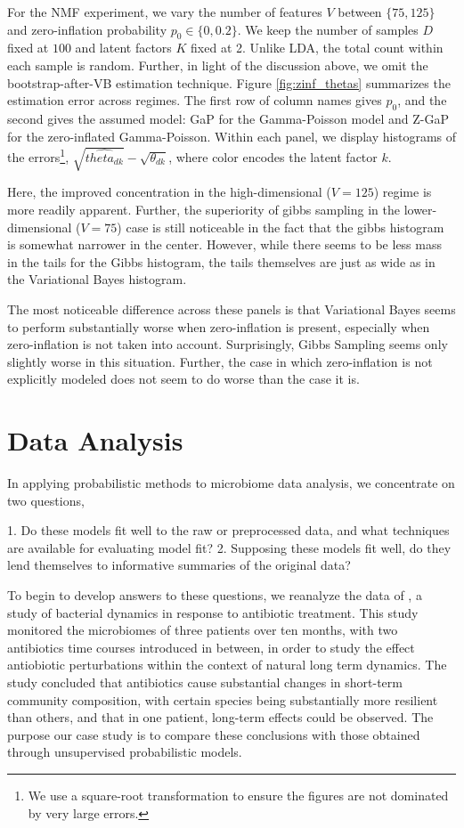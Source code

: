 \documentclass[oupdraft]{bio}
\begin{document}
For the NMF experiment, we vary the number of features $V$ between $\{75, 125\}$
and zero-inflation probability $p_{0} \in \{0, 0.2\}$. We keep the number of samples
$D$ fixed at $100$ and latent factors $K$ fixed at 2. Unlike LDA, the total
count within each sample is random. Further, in light of the discussion above,
we omit the bootstrap-after-VB estimation technique. Figure
\ref{fig:zinf_thetas} summarizes the estimation error across regimes. The first
row of column names gives $p_{0}$, and the second gives the assumed model: GaP
for the Gamma-Poisson model and Z-GaP for the zero-inflated Gamma-Poisson.
Within each panel, we display histograms of the errors\footnote{We use a
  square-root transformation to ensure the figures are not dominated by very
  large errors.}, $\sqrt{\hat{theta_{dk}}} - \sqrt{\theta_{dk}}$, where color
encodes the latent factor $k$.

Here, the improved concentration in the high-dimensional ($V = 125$) regime is
more readily apparent. Further, the superiority of gibbs sampling in the
lower-dimensional ($V = 75$) case is still noticeable in the fact that the gibbs
histogram is somewhat narrower in the center. However, while there seems to be
less mass in the tails for the Gibbs histogram, the tails themselves are just as
wide as in the Variational Bayes histogram. 

The most noticeable difference across these panels is that Variational Bayes
seems to perform substantially worse when zero-inflation is present, especially
when zero-inflation is not taken into account. Surprisingly, Gibbs Sampling
seems only slightly worse in this situation. Further, the case in which
zero-inflation is not explicitly modeled does not seem to do worse than the case
it is.

\section{Data Analysis}

In applying probabilistic methods to microbiome data analysis, we concentrate on
two questions,

1. Do these models fit well to the raw or preprocessed data, and what techniques
are available for evaluating model fit?
2. Supposing these models fit well, do they lend themselves to informative
summaries of the original data?

To begin to develop answers to these questions, we reanalyze the data of
\citep{dethlefsen2011incomplete}, a study of bacterial dynamics in response to
antibiotic treatment. This study monitored the microbiomes of three patients
over ten months, with two antibiotics time courses introduced in between, in
order to study the effect antiobiotic perturbations within the context of
natural long term dynamics. The study concluded that antibiotics cause
substantial changes in short-term community composition, with certain species
being substantially more resilient than others, and that in one patient,
long-term effects could be observed. The purpose our case study is to compare
these conclusions with those obtained through unsupervised probabilistic models.
\end{document}
